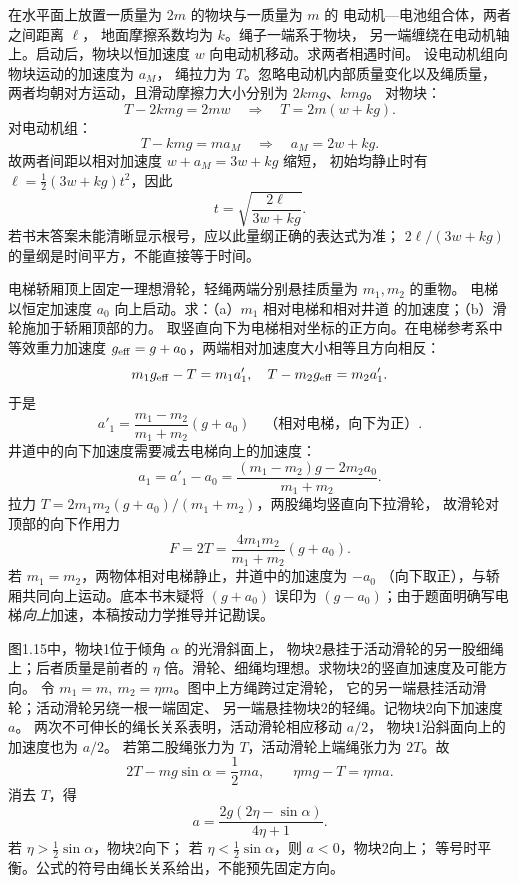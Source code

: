 在水平面上放置一质量为 $2m$ 的物块与一质量为 $m$ 的
电动机—电池组合体，两者之间距离 $\ell$，
地面摩擦系数均为 $k$。绳子一端系于物块，
另一端缠绕在电动机轴上。启动后，物块以恒加速度 $w$
向电动机移动。求两者相遇时间。
\exsolution
设电动机组向物块运动的加速度为 $a_M$，
绳拉力为 $T$。忽略电动机内部质量变化以及绳质量，
两者均朝对方运动，且滑动摩擦力大小分别为 $2kmg$、$kmg$。
对物块：
\[
 T-2kmg=2mw\quad\Longrightarrow\quad T=2m(w+kg).
\]
对电动机组：
\[
 T-kmg=ma_M
 \quad\Longrightarrow\quad
 a_M=2w+kg.
\]
故两者间距以相对加速度 $w+a_M=3w+kg$ 缩短，
初始均静止时有
$\ell=\frac12(3w+kg)t^2$，因此
\[
 \boxed{t=\sqrt{\frac{2\ell}{3w+kg}}.}
\]
\excheck 若书末答案未能清晰显示根号，应以此量纲正确的表达式为准；
$2\ell/(3w+kg)$ 的量纲是时间平方，不能直接等于时间。

电梯轿厢顶上固定一理想滑轮，轻绳两端分别悬挂质量为 $m_1,m_2$ 的重物。
电梯以恒定加速度 $a_0$ 向上启动。求：（a）$m_1$ 相对电梯和相对井道
的加速度；（b）滑轮施加于轿厢顶部的力。
\exsolution
取竖直向下为电梯相对坐标的正方向。在电梯参考系中等效重力加速度
$g_{\rm eff}=g+a_0$，两端相对加速度大小相等且方向相反：
\[
m_1g_{\rm eff}-T=m_1a'_1,\quad
T-m_2g_{\rm eff}=m_2a'_1 .
\]
于是
\[
\boxed{a'_1=\frac{m_1-m_2}{m_1+m_2}(g+a_0)}
\quad\text{（相对电梯，向下为正）}.
\]
井道中的向下加速度需要减去电梯向上的加速度：
\[
\boxed{a_1=a'_1-a_0
 =\frac{(m_1-m_2)g-2m_2a_0}{m_1+m_2}}.
\]
拉力 $T=2m_1m_2(g+a_0)/(m_1+m_2)$，两股绳均竖直向下拉滑轮，
故滑轮对顶部的向下作用力
\[
\boxed{F=2T=\frac{4m_1m_2}{m_1+m_2}(g+a_0)}.
\]
\excheck 若 $m_1=m_2$，两物体相对电梯静止，井道中的加速度为 $-a_0$
（向下取正），与轿厢共同向上运动。底本书末疑将 $(g+a_0)$ 误印为
$(g-a_0)$；由于题面明确写电梯\emph{向上}加速，本稿按动力学推导并记勘误。

图1.15中，物块1位于倾角 $\alpha$ 的光滑斜面上，
物块2悬挂于活动滑轮的另一股细绳上；后者质量是前者的
$\eta$ 倍。滑轮、细绳均理想。求物块2的竖直加速度及可能方向。
\exsolution
令 $m_1=m,\ m_2=\eta m$。图中上方绳跨过定滑轮，
它的另一端悬挂活动滑轮；活动滑轮另绕一根一端固定、
另一端悬挂物块2的轻绳。记物块2向下加速度 $a$。
两次不可伸长的绳长关系表明，活动滑轮相应移动 $a/2$，
物块1沿斜面向上的加速度也为 $a/2$。
若第二股绳张力为 $T$，活动滑轮上端绳张力为 $2T$。故
\[
2T-mg\sin\alpha=\frac12ma,\qquad
\eta mg-T=\eta ma.
\]
消去 $T$，得
\[
\boxed{a=\frac{2g(2\eta-\sin\alpha)}{4\eta+1}}.
\]
\excheck 若 $\eta>\tfrac12\sin\alpha$，物块2向下；
若 $\eta<\tfrac12\sin\alpha$，则 $a<0$，物块2向上；
等号时平衡。公式的符号由绳长关系给出，不能预先固定方向。

